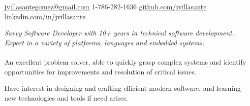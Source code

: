 \documentclass[10pt,a4paper]{article}
\begin{document}
\sloppy  %



\nobreakvspace{0.3em}  %

\noindent\href{mailto:jvillasantegomez.at.gmail.dot.com}{jvillasantegomez\mbox{}@\mbox{}gmail.com}\sbull
\textsmaller{+}1-786-282-1636\sbull
\href{https://github.com/jvillasante}{github.com/jvillasante}\sbull
\href{http://linkedin.com/in/jvillasante}{linkedin.com/in/jvillasante}
\\

\spacedhrule{0.9em}{-0.4em}  %


\vspace{-1.3em}  %
\begin{multicols}{2}  %
\noindent \emph{Savvy Software Developer with 10+ years in technical software development. Expert in a variety of platforms, languages and embedded systems.}
\\
\\
An excellent problem solver, able to quickly grasp complex systems and identify opportunities for improvements and resolution of critical issues.

Have interest in designing and crafting efficient modern software, and learning new technologies and tools if need arises.
\end{multicols}

\spacedhrule{0em}{-0.4em}

\end{document}
